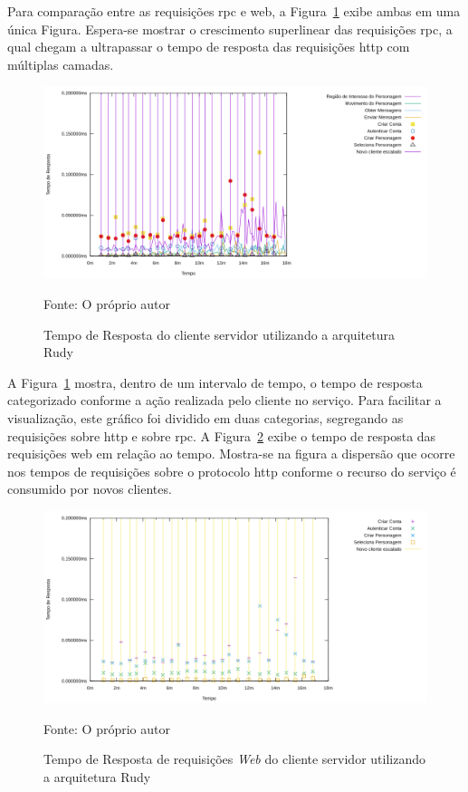 Para comparação entre as requisições \ac{rpc} e web, a Figura~\ref{fig:rudy_t4_reqs} exibe ambas em uma única Figura.
%
Espera-se mostrar o crescimento superlinear das requisições \ac{rpc}, a qual chegam a ultrapassar o tempo de resposta das requisições \ac{http} com múltiplas camadas.

\begin{figure}[htb!]
    \caption{Tempo de Resposta do cliente servidor utilizando a arquitetura Rudy}
    \label{fig:rudy_t4_reqs}
    \includegraphics[width=\textwidth]{metricas_rudy_t4/rudyc.png}
    \centering
    
    Fonte: O próprio autor
\end{figure}

A Figura~\ref{fig:rudy_t4_reqs} mostra, dentro de um intervalo de tempo, o tempo de resposta categorizado conforme a ação realizada pelo cliente no serviço.
%
Para facilitar a visualização, este gráfico foi dividido em duas categorias, segregando as requisições sobre \ac{http} e sobre \ac{rpc}.
%
A Figura~\ref{fig:rudy_t4_reqs_https} exibe o tempo de resposta das requisições web em relação ao tempo.
%
Mostra-se na figura a dispersão que ocorre nos tempos de requisições sobre o protocolo \ac{http} conforme o recurso do serviço é consumido por novos clientes.
 

\begin{figure}[htb!]
    \caption{Tempo de Resposta de requisições \textit{Web} do cliente servidor utilizando a arquitetura Rudy}
    \label{fig:rudy_t4_reqs_https}
    \includegraphics[width=\textwidth]{metricas_rudy_t4/rudyc_http.png}
    \centering
    
    Fonte: O próprio autor
\end{figure}


